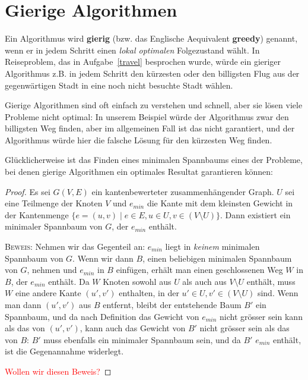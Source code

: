 \documentclass[12pt,a4paper]{report}
\theoremstyle{break}
\theoremstyle{plain}
\newtheorem{proof}{Satz}[section]
\begin{document}
\section{Gierige Algorithmen}

Ein Algorithmus wird \textbf{gierig} (bzw. das Englische Aequivalent
\textbf{greedy}) genannt, wenn er in jedem Schritt einen \emph{lokal
  optimalen} Folgezustand w\"{a}hlt. In Reiseproblem, das in
Aufgabe~\ref{travel} besprochen wurde, w\"{u}rde ein gieriger
Algorithmus z.B. in jedem Schritt den k\"{u}rzesten oder den
billigsten Flug aus der gegenw\"{a}rtigen Stadt in eine noch nicht
besuchte Stadt w\"{a}hlen.

Gierige Algorithmen sind oft einfach zu verstehen und schnell, aber
sie l\"{o}sen viele Probleme nicht optimal: In unserem Beispiel
w\"{u}rde der Algorithmus zwar den billigsten Weg finden, aber im
allgemeinen Fall ist das nicht garantiert, und der Algorithmus
w\"{u}rde hier die falsche L\"{o}sung f\"{u}r den k\"{u}rzesten Weg
finden.

Gl\"{u}cklicherweise ist das Finden eines minimalen Spannbaums eines
der Probleme, bei denen gierige Algorithmen ein optimales Resultat
garantieren k\"{o}nnen:

\begin{proof}\label{minimalkante}
  Es sei $G(V,E)$ ein kantenbewerteter
  zusammenh\"{a}ngender Graph. $U$ sei eine Teilmenge der Knoten $V$ und
  $e_{min}$ die Kante mit dem kleinsten Gewicht in der Kantenmenge
  $\{e=(u,v) \mid e\in E, u\in U, v\in (V\!\setminus\!U) \}$. Dann existiert ein
  minimaler Spannbaum von $G$, der $e_{min}$ enth\"{a}lt.

 \bigskip\noindent\textsc{Beweis:} Nehmen wir das Gegenteil an: $e_{min}$
liegt in \emph{keinem} minimalen Spannbaum von $G$. Wenn wir dann $B$,
einen beliebigen minimalen Spannbaum von $G$, nehmen und $e_{min}$ in $B$
einf\"{u}gen, erh\"{a}lt man einen geschlossenen Weg $W$ in $B$, der
$e_{min}$ enth\"{a}lt. Da $W$ Knoten sowohl aus $U$ als auch aus
$V\!\setminus\!U$ enth\"{a}lt, muss $W$ eine andere Kante $(u', v')$
enthalten, in der $u' \in U, v'\in (V\!\setminus\!U)$ sind. Wenn man
dann $(u',v')$ aus $B$ entfernt, bleibt der entstehende Baum $B'$ ein Spannbaum, und da nach
Definition das Gewicht von $e_{min}$ nicht gr\"{o}sser sein kann als
das von $(u',v')$, kann auch das Gewicht von $B'$ nicht
gr\"{o}sser sein als das von $B$: $B'$ muss ebenfalls ein minimaler
Spannbaum sein, und da $B'$ $e_{min}$ enth\"{a}lt, ist die
Gegenannahme widerlegt.

\textcolor{red}{Wollen wir diesen Beweis?}
\end{proof} 
\end{document}
